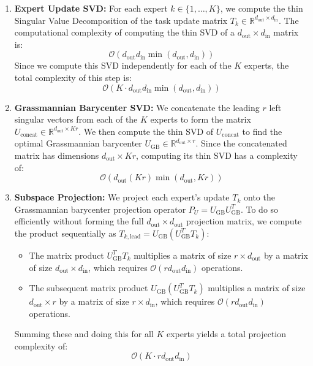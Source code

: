 \documentclass{article}
\theoremstyle{plain}
\theoremstyle{definition}
\theoremstyle{remark}
\begin{document}
\begin{enumerate}
    \item \textbf{Expert Update SVD:} For each expert $k \in \{1, \ldots, K\}$, we compute the thin Singular Value Decomposition of the task update matrix $T_k \in \mathbb{R}^{d_{\text{out}} \times d_{\text{in}}}$. The computational complexity of computing the thin SVD of a $d_{\text{out}} \times d_{\text{in}}$ matrix is:
    \begin{equation}
        \mathcal{O}\left( d_{\text{out}} d_{\text{in}} \min(d_{\text{out}}, d_{\text{in}}) \right)
    \end{equation}
    Since we compute this SVD independently for each of the $K$ experts, the total complexity of this step is:
    \begin{equation}
        \mathcal{O}\left( K \cdot d_{\text{out}} d_{\text{in}} \min(d_{\text{out}}, d_{\text{in}}) \right)
    \end{equation}

    \item \textbf{Grassmannian Barycenter SVD:} We concatenate the leading $r$ left singular vectors from each of the $K$ experts to form the matrix $U_{\text{concat}} \in \mathbb{R}^{d_{\text{out}} \times Kr}$. We then compute the thin SVD of $U_{\text{concat}}$ to find the optimal Grassmannian barycenter $U_{\text{GB}} \in \mathbb{R}^{d_{\text{out}} \times r}$. Since the concatenated matrix has dimensions $d_{\text{out}} \times Kr$, computing its thin SVD has a complexity of:
    \begin{equation}
        \mathcal{O}\left( d_{\text{out}} (Kr) \min(d_{\text{out}}, Kr) \right)
    \end{equation}

    \item \textbf{Subspace Projection:} We project each expert's update $T_k$ onto the Grassmannian barycenter projection operator $P_U = U_{\text{GB}} U_{\text{GB}}^T$. To do so efficiently without forming the full $d_{\text{out}} \times d_{\text{out}}$ projection matrix, we compute the product sequentially as $T_{k, \text{lead}} = U_{\text{GB}} \left( U_{\text{GB}}^T T_k \right)$:
    \begin{itemize}
        \item The matrix product $U_{\text{GB}}^T T_k$ multiplies a matrix of size $r \times d_{\text{out}}$ by a matrix of size $d_{\text{out}} \times d_{\text{in}}$, which requires $\mathcal{O}(r d_{\text{out}} d_{\text{in}})$ operations.
        \item The subsequent matrix product $U_{\text{GB}} (U_{\text{GB}}^T T_k)$ multiplies a matrix of size $d_{\text{out}} \times r$ by a matrix of size $r \times d_{\text{in}}$, which requires $\mathcal{O}(r d_{\text{out}} d_{\text{in}})$ operations.
    \end{itemize}
    Summing these and doing this for all $K$ experts yields a total projection complexity of:
    \begin{equation}
        \mathcal{O}\left( K \cdot r d_{\text{out}} d_{\text{in}} \right)
    \end{equation}


\end{enumerate}
\end{document}

